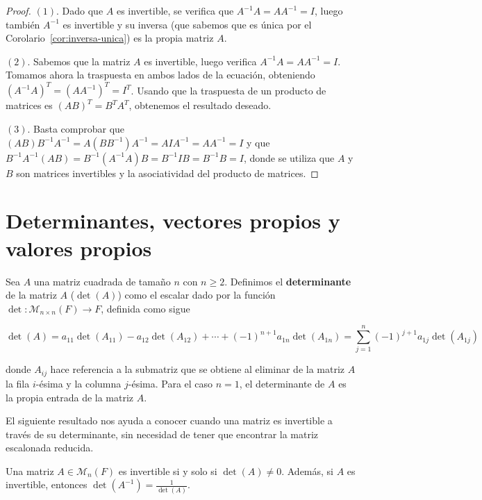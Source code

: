 \begin{proof}
    \textbf{\((1)\)}. Dado que $A$ es invertible, se verifica que $A^{-1}A = AA^{-1} = I$, luego también $A^{-1}$ es invertible y su inversa (que sabemos que es única por el Corolario~\ref{cor:inversa-unica}) es la propia matriz $A$.\newline

    \textbf{\((2)\)}. Sabemos que la matriz $A$ es invertible, luego verifica $A^{-1}A = AA^{-1} = I$. Tomamos ahora la traspuesta en ambos lados de la ecuación, obteniendo ${(A^{-1}A)}^{T} = {(AA^{-1})}^{T} = I^{T}$. Usando que la traspuesta de un producto de matrices es ${(AB)}^{T} = B^{T}A^{T}$, obtenemos el resultado deseado.\newline

    \textbf{\((3)\)}. Basta comprobar que ${(AB)B^{-1}A^{-1}} = A(BB^{-1})A^{-1} = AIA^{-1} = AA^{-1} = I$ y que $B^{-1}A^{-1}(AB) = B^{-1}(A^{-1}A)B = B^{-1}IB = B^{-1}B = I$, donde se utiliza que $A$ y $B$ son matrices invertibles y la asociatividad del producto de matrices. \newline
\end{proof}

\section{Determinantes, vectores propios y valores propios}\label{sec:determinante-vectores-valores-propios}

\begin{definicion}
    Sea $A$ una matriz cuadrada de tamaño $n$ con $n \geq 2$. Definimos el \textbf{determinante} de la matriz $A$ ($\det(A)$) como el escalar dado por la función $\det: \mathcal{M}_{n \times n}(F) \to F$, definida como sigue

    \[ \det(A) = a_{11} \det(A_{11}) -  a_{12} \det(A_{12}) + \cdots + (-1)^{n+1}a_{1n} \det(A_{1n}) = \sum_{j=1}^{n}(-1)^{j+1}a_{1j} \det(A_{1j})\]

    donde $A_{ij}$ hace referencia a la submatriz que se obtiene al eliminar de la matriz $A$ la fila $i$-ésima y la columna $j$-ésima. Para el caso $n=1$, el determinante de $A$ es la propia entrada de la matriz $A$.\newline
\end{definicion}


El siguiente resultado nos ayuda a conocer cuando una matriz es invertible a través de su determinante, sin necesidad de tener que encontrar la matriz escalonada reducida.
\begin{corolario}\label{cor:det-inversa}
    Una matriz $A \in \mathcal{M}_{n}(F)$ es invertible si y solo si $\det(A) \neq 0$. Además, si $A$ es invertible, entonces $\det(A^{-1})=\frac{1}{\det(A)}$.
\end{corolario}

